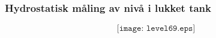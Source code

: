 \documentclass[aspectratio=169,xcolor=dvipsnames]{beamer}
\begin{document}
%
%
%
%
%
%
\begin{frame}
	\frametitle{Hydrostatisk måling av nivå i lukket tank}

	$$\texttt{[image: level69.eps]}$$
\end{frame}
%
%
%
%
%
%
%
%
\end{document}
